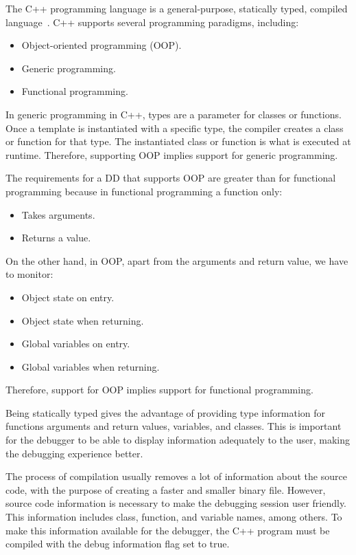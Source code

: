 The C++ programming language is a general-purpose, statically typed, compiled language~\cite{cppHistory}.
%
C++ supports several programming paradigms, including:

\begin{itemize}
    \item Object-oriented programming (OOP).
    \item Generic programming.
    \item Functional programming.
\end{itemize}

In generic programming in C++, types are a parameter for classes or functions.
Once a template is instantiated with a specific type, the compiler creates a class or function for that type.
The instantiated class or function is what is executed at runtime. Therefore, supporting OOP implies support for generic programming.

The requirements for a DD that supports OOP are greater than for functional programming because in functional programming a function only:
\begin{itemize}
    \item Takes arguments.
    \item Returns a value.
\end{itemize}
On the other hand, in OOP, apart from the arguments and return value, we have to monitor:
\begin{itemize}
    \item Object state on entry.
    \item Object state when returning.
    \item Global variables on entry.
    \item Global variables when returning.
\end{itemize}
Therefore, support for OOP implies support for functional programming.

Being statically typed gives the advantage of providing type information for functions arguments and return values, variables, and classes. This is important for the debugger to be able to display information adequately to the user, making the debugging experience better.

The process of compilation usually removes a lot of information about the source code, with the purpose of creating a faster and smaller binary file.
However, source code information is necessary to make the debugging session user friendly. This information includes class, function, and variable names, among others.
To make this information available for the debugger, the C++ program must be compiled with the debug information flag set to true.

